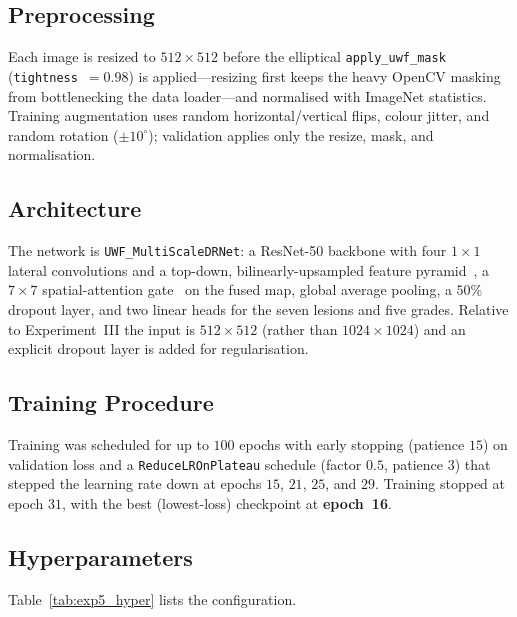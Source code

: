 \documentclass[journal,twoside,web]{ieeecolor}
\begin{document}
\subsection{Preprocessing}
Each image is resized to $512\times512$ before the elliptical
\texttt{apply\_uwf\_mask} (\texttt{tightness}~$=0.98$) is applied---resizing first
keeps the heavy OpenCV masking from bottlenecking the data loader---and normalised
with ImageNet statistics. Training augmentation uses random horizontal/vertical
flips, colour jitter, and random rotation ($\pm10^{\circ}$); validation applies only
the resize, mask, and normalisation.

\subsection{Architecture}
The network is \texttt{UWF\_MultiScaleDRNet}: a ResNet-50 backbone with four
$1\times1$ lateral convolutions and a top-down, bilinearly-upsampled feature
pyramid~\cite{fpn}, a $7\times7$ spatial-attention gate~\cite{cbam} on the fused
map, global average pooling, a $50\%$ dropout layer, and two linear heads for the
seven lesions and five grades. Relative to Experiment~III the input is
$512\times512$ (rather than $1024\times1024$) and an explicit dropout layer is added
for regularisation.

\subsection{Training Procedure}
Training was scheduled for up to $100$ epochs with early stopping (patience $15$) on
validation loss and a \texttt{ReduceLROnPlateau} schedule (factor $0.5$, patience
$3$) that stepped the learning rate down at epochs $15$, $21$, $25$, and $29$.
Training stopped at epoch $31$, with the best (lowest-loss) checkpoint at
\textbf{epoch~16}.

\subsection{Hyperparameters}
Table~\ref{tab:exp5_hyper} lists the configuration.
\end{document}
